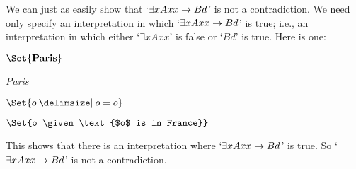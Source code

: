 We can just as easily show that `$\exists xAxx \rightarrow Bd$' is not a contradiction. We need only specify an interpretation in which `$\exists xAxx \rightarrow Bd$' is true; i.e., an interpretation in which either `$\exists x Axx$' is false or `$Bd$' is true. Here is one:
	\begin{interp}
		\item[\domain] $\Set{\emph{Paris}}$
		\item[\denote{d}] \emph{Paris}
		\item[\denote{A}] $\Set{o \given o=o}$
		\item[\denote{B}] $\Set{o \given \text{$o$ is in France}}$
	\end{interp}
This shows that there is an interpretation where `$\exists xAxx \rightarrow Bd$' is true. So `$\exists x Axx \rightarrow Bd$' is not a contradiction.

